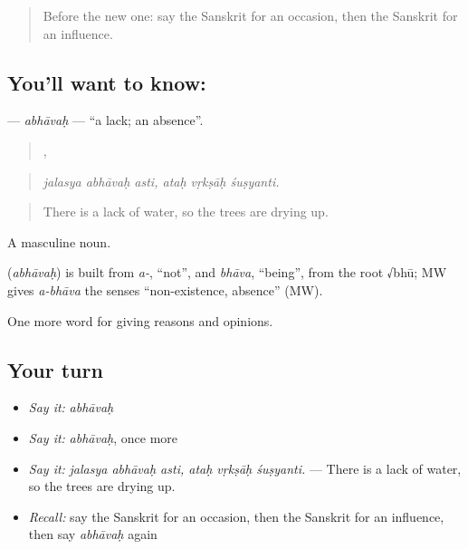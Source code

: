 \label{lesson:SA-C340-abhavah}



\begin{quote}
Before the new one: say the Sanskrit for an occasion, then the Sanskrit for an influence.
\end{quote}

\subsection*{You'll want to know: }
\textbf{} — \emph{abhāvaḥ} — \textquotedblleft{}a lack; an absence\textquotedblright{}.

\begin{quote}
  ,   
\end{quote}

\begin{quote}
\emph{jalasya abhāvaḥ asti, ataḥ vṛkṣāḥ śuṣyanti.}
\end{quote}

\begin{quote}
There is a lack of water, so the trees are drying up.
\end{quote}

A masculine noun.

\begin{cousinweb}
\textbf{} (\emph{abhāvaḥ}) is built from \emph{a-}, \textquotedblleft{}not\textquotedblright{}, and \emph{bhāva}, \textquotedblleft{}being\textquotedblright{}, from the root √bhū; MW gives \emph{a-bhāva} the senses \textquotedblleft{}non-existence, absence\textquotedblright{} (MW).
\end{cousinweb}

\begin{grammarlens}[title={What you've built}]
One more word for giving reasons and opinions.
\end{grammarlens}

\subsection*{Your turn}
\begin{itemize}
\raggedright
  \item \emph{Say it:} \emph{abhāvaḥ}
  \item \emph{Say it:} \emph{abhāvaḥ}, once more
  \item \emph{Say it:} \emph{jalasya abhāvaḥ asti, ataḥ vṛkṣāḥ śuṣyanti.} — There is a lack of water, so the trees are drying up.
  \item \emph{Recall:} say the Sanskrit for an occasion, then the Sanskrit for an influence, then say \emph{abhāvaḥ} again
\end{itemize}

